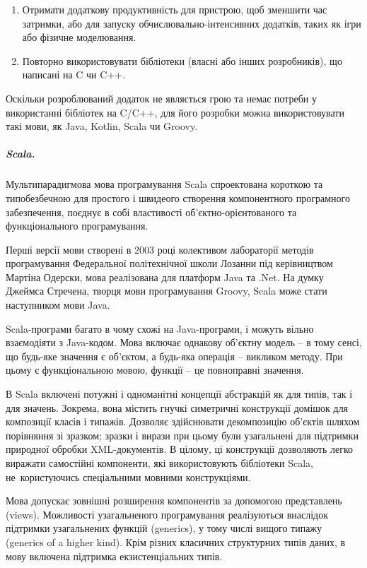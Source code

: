 \documentclass[../main.tex]{subfiles}
\begin{document}
\begin{enumerate}
	\item Отримати додаткову продуктивність для пристрою, щоб зменшити час затримки, або для запуску обчислювально-інтенсивних додатків, таких як ігри або фізичне моделювання.
	\item Повторно використовувати бібліотеки (власні або інших розробників), що написані на C чи C++.
\end{enumerate}

Оскільки розроблюваний додаток не являється грою та немає потреби у використанні бібліотек на C/C++, для його розробки можна використовувати такі мови, як Java, Kotlin, Scala чи Groovy.

\subparagraph{Scala.}
Мультипарадигмова мова програмування Scala спроектована короткою та типобезбечною для простого і швидеого створення компонентного програмного забезпечення, поєднує в собі властивості об'єктно-орієнтованого та функціонального програмування. 

Перші версії мови створені в 2003 році колективом лабораторії методів програмування Федеральної політехнічної школи Лозанни під керівництвом Мартіна Одерски, мова реалізована для платформ Java та .Net. На думку Джеймса Стречена, творця мови програмування Groovy, Scala може стати наступником мови Java.

Scala-програми багато в чому схожі на Java-програми, і можуть вільно взаємодіяти з Java-кодом. Мова включає однакову об'єктну модель -- в тому сенсі, що будь-яке значення є об'єктом, а будь-яка операція -- викликом методу. При цьому є функціональною мовою, функції -- це повноправні значення.

В Scala включені потужні і одноманітні концепції абстракцій як для типів, так і для значень. Зокрема, вона містить гнучкі симетричні конструкції домішок для композиції класів і типажів. Дозволяє здійснювати декомпозицію об'єктів шляхом порівняння зі зразком; зразки і вирази при цьому були узагальнені для підтримки природної обробки XML-\linebreak[0]документів. В цілому, ці конструкції дозволяють легко виражати самостійні компоненти, які використовують бібліотеки Scala, не~користуючись спеціальними мовними конструкціями.

Мова допускає зовнішні розширення компонентів за допомогою представлень (views). Можливості узагальненого програмування реалізуються внаслідок підтримки узагальнених функцій (generics), у тому числі вищого типажу (generics of a higher kind). Крім різних класичних структурних типів даних, в мову включена підтримка екзистенціальних типів.
\end{document}
